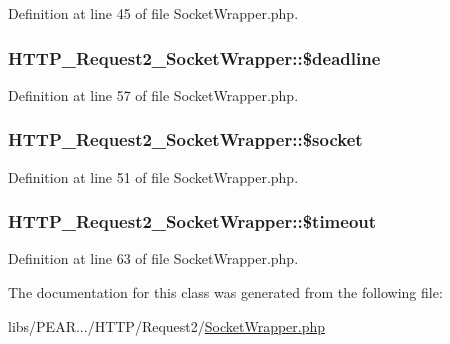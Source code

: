 Definition at line 45 of file Socket\-Wrapper.\-php.

\hypertarget{classHTTP__Request2__SocketWrapper_a60fb3c60ee5ae016778114722bba86e4}{
\subsubsection[{\$deadline}]{\setlength{\rightskip}{0pt plus 5cm}H\-T\-T\-P\-\_\-\-Request2\-\_\-\-Socket\-Wrapper\-::\$deadline\hspace{0.3cm}{\ttfamily [protected]}}}\label{classHTTP__Request2__SocketWrapper_a60fb3c60ee5ae016778114722bba86e4}


Definition at line 57 of file Socket\-Wrapper.\-php.

\hypertarget{classHTTP__Request2__SocketWrapper_a76f6510956270cea38ea1ea23387a7fe}{
\subsubsection[{\$socket}]{\setlength{\rightskip}{0pt plus 5cm}H\-T\-T\-P\-\_\-\-Request2\-\_\-\-Socket\-Wrapper\-::\$socket\hspace{0.3cm}{\ttfamily [protected]}}}\label{classHTTP__Request2__SocketWrapper_a76f6510956270cea38ea1ea23387a7fe}


Definition at line 51 of file Socket\-Wrapper.\-php.

\hypertarget{classHTTP__Request2__SocketWrapper_a1ad0716141ad4c8eaa0da661a4471fe7}{
\subsubsection[{\$timeout}]{\setlength{\rightskip}{0pt plus 5cm}H\-T\-T\-P\-\_\-\-Request2\-\_\-\-Socket\-Wrapper\-::\$timeout\hspace{0.3cm}{\ttfamily [protected]}}}\label{classHTTP__Request2__SocketWrapper_a1ad0716141ad4c8eaa0da661a4471fe7}


Definition at line 63 of file Socket\-Wrapper.\-php.



The documentation for this class was generated from the following file\-:\begin{DoxyCompactItemize}
\item 
libs/\-P\-E\-A\-R.../\-H\-T\-T\-P/\-Request2/\hyperlink{SocketWrapper_8php}{Socket\-Wrapper.\-php}\end{DoxyCompactItemize}
